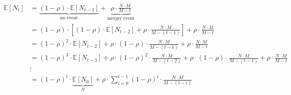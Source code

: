 \documentclass[american]{scrartcl}
\newcommand{\E}{\mathbb{E}}
\begin{document}
\begin{equation*}
    \begin{split}
        \E[N_t] &= \underbrace{(1 - \rho) \cdot \E[N_{t-1}]}_{\text{no event}} + \underbrace{\rho \cdot \frac{N \cdot M}{M-t}}_{\text{merger event}} \\
        &= (1 - \rho) \cdot \left[ (1 - \rho) \cdot \E[N_{t-2}] + \rho \cdot \frac{N \cdot M}{M - (t-1)} \right] + \rho \cdot \frac{N \cdot M}{M-t} \\
        &=(1 - \rho)^2 \cdot  \E[N_{t-2}] + \rho \cdot (1 - \rho) \cdot \frac{N \cdot M}{M - (t - 1)} + \rho \cdot \frac{N\cdot M}{M-t} \\
        &= (1 - \rho)^3 \cdot  \E[N_{t-3}] + \rho \cdot (1 - \rho)^2 \cdot \frac{N \cdot M}{M - (t - 2)} + \rho \cdot (1 - \rho) \cdot \frac{N \cdot M}{M - (t - 1)} + \rho \cdot \frac{N\cdot M}{M-t}  \\
        &\vdots \\
        &= (1 - \rho)^t \cdot \underbrace{\E[N_0]}_{N} + \rho \cdot \sum^{t-1}_{i = 0} (1 - \rho)^{i} \cdot \frac{N \cdot M}{M - (t - i)}
    \end{split}
\end{equation*}
\end{document}
